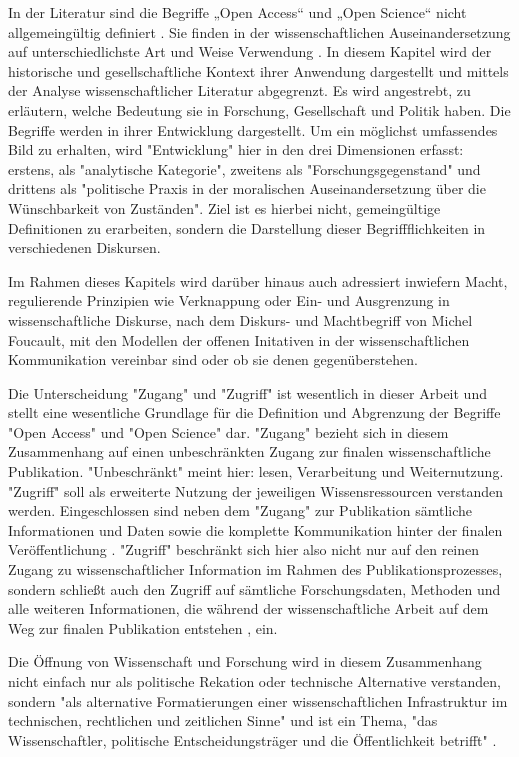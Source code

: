 In der Literatur sind die Begriffe „Open Access“ und „Open Science“ nicht allgemeingültig definiert \cite{suchen}. Sie finden in der wissenschaftlichen Auseinandersetzung auf unterschiedlichste Art und Weise Verwendung \cite{cite:9}. In diesem Kapitel wird der historische und gesellschaftliche Kontext ihrer Anwendung dargestellt und mittels der Analyse wissenschaftlicher Literatur abgegrenzt. Es wird angestrebt, zu erläutern, welche Bedeutung sie in Forschung, Gesellschaft und Politik haben. Die Begriffe werden in ihrer Entwicklung dargestellt. Um ein möglichst umfassendes Bild zu erhalten, wird "Entwicklung" hier in den drei Dimensionen erfasst: erstens, als "analytische Kategorie", zweitens als "Forschungsgegenstand" und drittens als "politische Praxis in der moralischen Auseinandersetzung über die Wünschbarkeit von Zuständen". \cite{cite:10} Ziel ist es hierbei nicht, gemeingültige Definitionen zu erarbeiten, sondern die Darstellung dieser Begriffflichkeiten in verschiedenen Diskursen. 

Im Rahmen dieses Kapitels wird darüber hinaus auch adressiert inwiefern Macht, regulierende Prinzipien wie Verknappung oder Ein- und Ausgrenzung in wissenschaftliche Diskurse, nach dem Diskurs- und Machtbegriff von Michel Foucault, mit den Modellen der offenen Initativen in der wissenschaftlichen Kommunikation vereinbar sind oder ob sie denen gegenüberstehen.

Die Unterscheidung "Zugang" und "Zugriff" ist wesentlich in dieser Arbeit und stellt eine wesentliche Grundlage für die Definition und Abgrenzung der Begriffe "Open Access" und "Open Science" dar. "Zugang" bezieht sich in diesem Zusammenhang auf einen unbeschränkten Zugang zur finalen wissenschaftliche Publikation. "Unbeschränkt" meint hier: lesen\cite{cite:9a}, Verarbeitung und Weiternutzung. "Zugriff" soll als erweiterte Nutzung der jeweiligen Wissensressourcen verstanden werden. Eingeschlossen sind neben dem "Zugang" zur Publikation sämtliche Informationen und Daten sowie die komplette Kommunikation hinter der finalen Veröffentlichung \cite{cite:9b}. "Zugriff" beschränkt sich hier also nicht nur auf den reinen Zugang zu wissenschaftlicher Information im Rahmen des Publikationsprozesses, sondern schließt auch den Zugriff auf sämtliche Forschungsdaten, Methoden und alle weiteren Informationen, die während der wissenschaftliche Arbeit auf dem Weg zur finalen Publikation entstehen \cite{cite:9c}, ein. 

Die Öffnung von Wissenschaft und Forschung wird in diesem Zusammenhang nicht einfach nur als politische  Rekation oder technische Alternative verstanden, sondern "als alternative Formatierungen einer wissenschaftlichen Infrastruktur im technischen, rechtlichen und zeitlichen Sinne" \cite{kelty_2004} und ist ein Thema, "das Wissenschaftler, politische Entscheidungsträger und die Öffentlichkeit betrifft" \cite{Scheliga_2014}.

